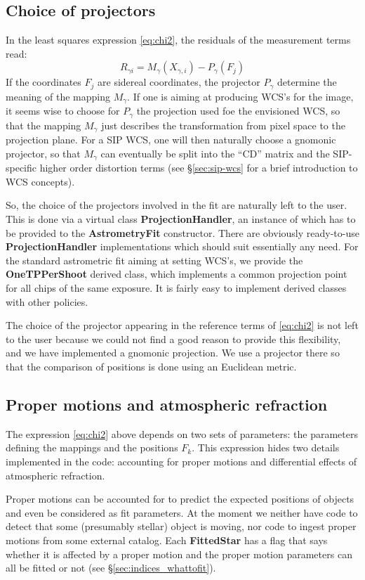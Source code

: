 \documentclass[a4paper,12pt]{scrartcl}
\newcommand{\ClName}[1]{{\bf #1}}
\def\bf{\normalfont\bfseries}
\begin{document}
\subsection{Choice of projectors}
In the least squares expression \ref{eq:chi2}, the residuals of the
measurement terms read:
$$
R_{\gamma i} = M_\gamma(X_{\gamma,i})-P_{\gamma}(F_j)
$$
If the coordinates $F_j$ are sidereal coordinates,
the projector $P_\gamma$ determine the meaning of
the mapping $M_\gamma$. If one is aiming at producing
WCS's for the image, it seems wise to choose for
$P_\gamma$ the projection used foe the envisioned WCS,
so that the mapping $M_\gamma$ just describes the 
transformation from pixel space to the projection plane.
For a SIP WCS, one will then naturally choose a gnomonic projector,
so that $M_\gamma$ can eventually be split into the ``CD'' matrix 
and the SIP-specific higher order distortion terms (see \S \ref{sec:sip-wcs}
for a brief introduction to WCS concepts).

So, the choice of the projectors involved in the fit
are naturally left to the user. This is done via a
virtual class \ClName{ProjectionHandler}, an instance
of which has to be provided to the \ClName{AstrometryFit} constructor.
There are obviously ready-to-use \ClName{ProjectionHandler} implementations
which should suit essentially any need. For the standard astrometric
fit aiming at setting WCS's, we provide the \ClName{OneTPPerShoot}
derived class, which implements a common projection point
for all chips of the same exposure. It is fairly easy to implement
derived classes with other policies.

The choice of the projector appearing in the reference terms of
\ref{eq:chi2} is not left to the user because we could not find a good
reason to provide this flexibility, and we have implemented a gnomonic
projection. We use a projector there so that the comparison of
positions is done using an Euclidean metric.


\subsection{Proper motions and atmospheric refraction}
The expression \ref{eq:chi2} above depends on two sets of parameters:
the parameters defining the mappings and the positions $F_k$. This expression
hides two details implemented in the code: accounting for proper
motions and differential effects of atmospheric refraction.

Proper motions can be accounted for to predict the expected positions
of objects and even be considered as fit parameters. At the moment we
neither have code to detect that some (presumably stellar) object is
moving, nor code to ingest proper motions from some external catalog.
Each \ClName{FittedStar} has a flag that says whether it is affected
by a proper motion and the proper motion parameters can all be fitted
or not (see \S \ref{sec:indices_whattofit}).
\end{document}
